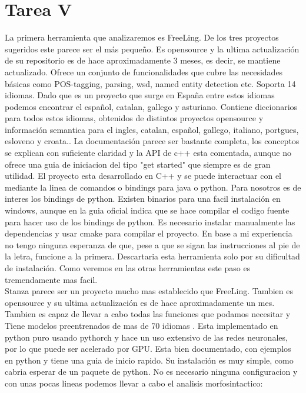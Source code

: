 \documentclass[11pt,a4paper]{report}
\begin{document}
	\section*{Tarea V}
	La primera herramienta que analizaremos es FreeLing. De los tres proyectos sugeridos este parece ser el más pequeño. Es opensource y la ultima actualización de su repositorio es de hace aproximadamente 3 meses, es decir, se mantiene actualizado. Ofrece un conjunto de funcionalidades que cubre las necesidades básicas como POS-tagging, parsing, wsd, named entity detection etc. Soporta 14 idiomas. Dado que es un proyecto que surge en España entre estos idiomas podemos encontrar el español, catalan, gallego y asturiano. Contiene diccionarios para todos estos idiomas, obtenidos de distintos proyectos opensource y información semantica para el ingles, catalan, español, gallego, italiano, portgues, esloveno y croata.. La documentación parece ser bastante completa, los conceptos se explican con suficiente claridad y la API de c++ esta comentada, aunque no ofrece una guia de iniciacion del tipo "get started" que siempre es de gran utilidad.  El proyecto esta desarrollado en C++ y se puede interactuar con el mediante la linea de comandos o bindings para java o python. Para nosotros es de interes los bindings de python. Existen binarios para una facil instalación en windows, aunque en la guia oficial indica que se hace compilar el codigo fuente para hacer uso de los bindings de python. Es necesario instalar manualmente las dependencias y usar cmake para compilar el proyecto. En base a mi experiencia no tengo ninguna esperanza de que, pese a que se sigan las instrucciones al pie de la letra, funcione a la primera. Descartaria esta herramienta solo por su dificultad de instalación. Como veremos en las otras herramientas este paso es tremendamente mas facil.\\
	
	Stanza parece ser un proyecto mucho mas establecido que FreeLing. Tambien es opensource y su ultima actualización es de hace aproximadamente un mes. Tambien es capaz de llevar a cabo todas las funciones que podamos necesitar y Tiene modelos preentrenados de mas de 70 idiomas . Esta implementado en python puro usando pythorch y hace un uso extensivo de las redes neuronales, por lo que puede ser acelerado por GPU. Esta bien documentado, con ejemplos en python y tiene una guia de inicio rapido. Su instalación es muy simple, como cabria esperar de un paquete de python. No es necesario ninguna configuracion y con unas pocas lineas podemos llevar a cabo el analisis morfosintactico:\\
	
\end{document}
